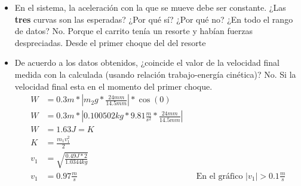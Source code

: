 \begin{enumerate}
\begin{itemize}
\begin{figure}[H]
						\label{fig:vel_vs_tmp}
				\end{figure}
				\begin{figure}[H]
					\centering
					\label{fig:ace_vs_tmp}
				\end{figure}
			\item En el sistema,
				la aceleración con la que se mueve debe ser constante.
				¿Las \textbf{tres} curvas son las esperadas?
				¿Por qué sí?
				¿Por qué no?
				¿En todo el rango de datos?
				\subitem No.
				\subitem Porque el carrito tenía un resorte y habían fuerzas despreciadas.
				\subitem Desde el primer choque del del resorte
			\item De acuerdo a los datos obtenidos,
				¿coincide el valor de la velocidad final medida con la calculada
				(usando relación trabajo-energía cinética)?
				\subitem No.
				Si la velocidad final esta en el momento del primer choque.
				\begin{align*}
					W &= 0.3m*|m_2g* \frac{24mm}{14.5mm}| *\cos(0)\\
					W &= 0.3m*|0.100502kg*9.81 \frac{m}{s^2} * \frac{24mm}{14.5mm}| \\
					W &= 1.63J = K \\
					K &= \frac{m_1v_1^2}{2} \\
					v_1 &= \sqrt{ \frac{0.49J*2}{1.0344kg} }\\
					v_1 &= 0.97 \frac{m}{s} &&\text{En el gráfico $|v_1|> 0.1 \frac{m}{s} $}
				\end{align*}
		\end{itemize}
\end{enumerate}
